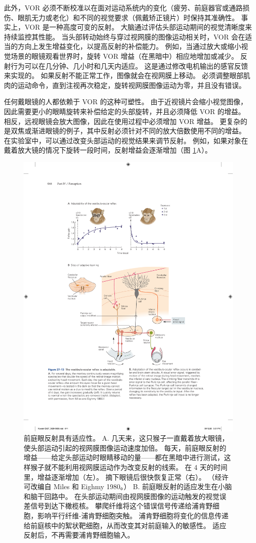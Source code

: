 此外，VOR 必须不断校准以在面对运动系统内的变化（疲劳、前庭器官或通路损伤、眼肌无力或老化）和不同的视觉要求（佩戴矫正镜片）时保持其准确性。
事实上，VOR 是一种高度可变的反射。
大脑通过评估头部运动期间的视觉清晰度来持续监控其性能。
当头部转动始终与穿过视网膜的图像运动相关时，VOR 会在适当的方向上发生增益变化，以提高反射的补偿能力。
例如，当通过放大或缩小视觉场景的眼镜观看世界时，旋转 VOR 增益（在黑暗中）相应地增加或减少。
反射行为可以在几分钟、几小时和几天内适应。 这是通过修改电机输出的感官反馈来实现的。
如果反射不能正常工作，图像就会在视网膜上移动。
必须调整眼部肌肉的运动命令，直到注视再次稳定，旋转视网膜图像运动为零，并且没有错误。


任何戴眼镜的人都依赖于 VOR 的这种可塑性。
由于近视镜片会缩小视觉图像，因此需要更小的眼睛旋转来补偿给定的头部旋转，并且必须降低 VOR 的增益。
相反，远视眼镜会放大图像，因此在使用过程中必须增加 VOR 增益。
更复杂的是双焦或渐进眼镜的例子，其中反射必须针对不同的放大倍数使用不同的增益。
在实验室中，可以通过改变头部运动的视觉结果来调节反射。 
例如，如果对象在戴着放大镜的情况下旋转一段时间，反射增益会逐渐增加（图 \ref{fig:27_13}A）。


\begin{figure}[htbp]
	\centering
	\includegraphics[width=0.75\linewidth]{chap27/fig_27_13}
	\caption{前庭眼反射具有适应性。 A. 几天来，这只猴子一直戴着放大眼镜，使头部运动引起的视网膜图像运动速度加倍。 每天，前庭眼反射的增益——给定头部运动时眼睛移动的量——都在黑暗中进行测试，这样猴子就不能利用视网膜运动作为改变反射的线索。 在 4 天的时间里，增益逐渐增加（左）。 摘下眼镜后很快恢复正常（右）。 （经许可改编自 Miles 和 Eighmy 1980。） B. 前庭眼反射的适应发生在小脑和脑干回路中。 在头部运动期间由视网膜图像的运动触发的视觉误差信号到达下橄榄核。 攀爬纤维将这个错误信号传递给浦肯野细胞，影响平行纤维-浦肯野细胞突触。 浦肯野细胞将变化的信息传递给前庭核中的絮状靶细胞，从而改变其对前庭输入的敏感性。 适应反射后，不再需要浦肯野细胞输入。}
	\label{fig:27_13}
\end{figure}


